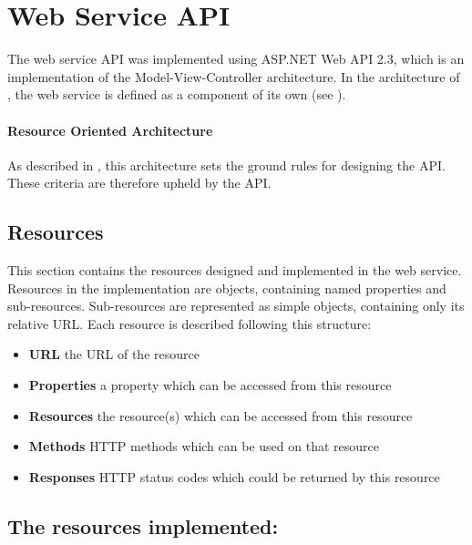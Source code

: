 \section{Web Service API}\label{design:web_service}
The web service API was implemented using ASP.NET Web API 2.3\cite{aspnet_webapi}, which is an implementation of the Model-View-Controller architecture.
In the architecture of \projectname{}, the web service is defined as a component of its own (see ).



\paragraph{Resource Oriented Architecture}
As described in , this architecture sets the ground rules for designing the API.
These criteria are therefore upheld by the API.

\subsection{Resources}\label{webservice:resources}
This section contains the resources designed and implemented in the web service.
Resources in the implementation are objects, containing named properties and sub-resources.
Sub-resources are represented as simple objects, containing only its relative URL.
Each resource is described following this structure:
\begin{itemize}
\item \textbf{URL} the URL of the resource
\item \textbf{Properties} a property which can be accessed from this resource
\item \textbf{Resources} the resource(s) which can be accessed from this resource
\item \textbf{Methods} HTTP methods which can be used on that resource
\item \textbf{Responses} HTTP status codes which could be returned by this resource
\end{itemize}

\subsection{The resources implemented:}
\newcommand{\resource}[6]{\noindent \vfill \fbox{\begin{minipage}{\textwidth}\begin{description}
\item[URL:]{\texttt{#1}}
\item[Properties:]{\texttt{#2}}
\item[Resources:]{\texttt{#3}}
\item[Methods:]{\texttt{#4}}
\item[Responses:]{\texttt{#5}}
\end{description}
{#6}
\end{minipage}
}\vfill }

